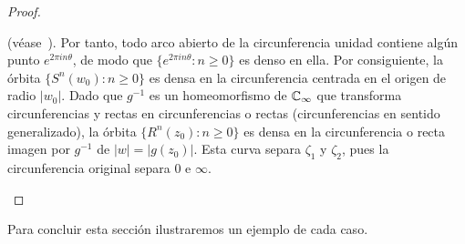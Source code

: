\begin{proof}
\begin{itemize}
          (véase~\cite[sección~7.4]{Apostol1990}). Por tanto, todo arco abierto
          de la circunferencia unidad contiene algún punto $e^{2\pi i
          n\theta}$, de modo que $\{e^{2\pi i n\theta} : n \geq 0\}$ es denso
          en ella. Por consiguiente, la órbita $\{S^n(w_0) : n \geq 0\}$ es
          densa en la circunferencia centrada en el origen de radio $|w_0|$.
          Dado que $g^{-1}$ es un homeomorfismo de $\mathbb{C}_\infty$ que transforma
          circunferencias y rectas en circunferencias o rectas (circunferencias
          en sentido generalizado), la órbita $\{R^n(z_0) : n \geq 0\}$ es
          densa en la circunferencia o recta imagen por $g^{-1}$ de $|w| =
          |g(z_0)|$. Esta curva separa $\zeta_1$ y $\zeta_2$, pues la
          circunferencia original separa $0$ e $\infty$.\qedhere
  \end{itemize}
\end{proof}

Para concluir esta sección ilustraremos un ejemplo de cada caso.

